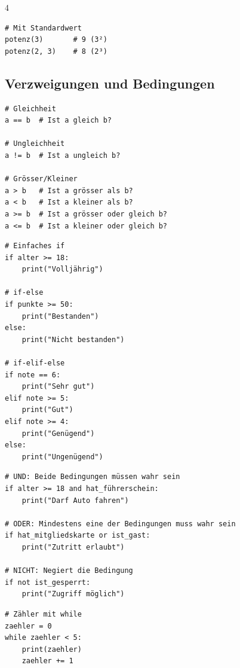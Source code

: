 \begin{landscape}
\begin{multicols*}{4}
\begin{cheatSheetBox}[title=Funktionen aufrufen]
\begin{lstlisting}
# Mit Standardwert
potenz(3)       # 9 (3²)
potenz(2, 3)    # 8 (2³)
\end{lstlisting}
		\end{cheatSheetBox}

		\columnbreak\textcolor{\cheatSheetColor}{\subsection*{Verzweigungen und Bedingungen}}

		\begin{cheatSheetBox}[title=Vergleichsoperatoren]
			\begin{lstlisting}
# Gleichheit
a == b  # Ist a gleich b?

# Ungleichheit
a != b  # Ist a ungleich b?

# Grösser/Kleiner
a > b   # Ist a grösser als b?
a < b   # Ist a kleiner als b?
a >= b  # Ist a grösser oder gleich b?
a <= b  # Ist a kleiner oder gleich b?
\end{lstlisting}
		\end{cheatSheetBox}

		\begin{cheatSheetBox}[title={if, elif, else}]
			\begin{lstlisting}
# Einfaches if
if alter >= 18:
    print("Volljährig")

# if-else
if punkte >= 50:
    print("Bestanden")
else:
    print("Nicht bestanden")

# if-elif-else
if note == 6:
    print("Sehr gut")
elif note >= 5:
    print("Gut")
elif note >= 4:
    print("Genügend")
else:
    print("Ungenügend")
\end{lstlisting}
		\end{cheatSheetBox}

		\begin{cheatSheetBox}[title=Logische Operatoren]
			\begin{lstlisting}
# UND: Beide Bedingungen müssen wahr sein
if alter >= 18 and hat_führerschein:
    print("Darf Auto fahren")

# ODER: Mindestens eine der Bedingungen muss wahr sein
if hat_mitgliedskarte or ist_gast:
    print("Zutritt erlaubt")

# NICHT: Negiert die Bedingung
if not ist_gesperrt:
    print("Zugriff möglich")
\end{lstlisting}
		\end{cheatSheetBox}

		\begin{cheatSheetBox}[title=while-Schleife]
			\begin{lstlisting}
# Zähler mit while
zaehler = 0
while zaehler < 5:
    print(zaehler)
    zaehler += 1


\end{lstlisting}
\end{cheatSheetBox}
\end{multicols*}
\end{landscape}
